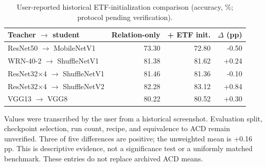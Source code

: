 \begin{table}[t]
\centering
\small
\setlength{\tabcolsep}{5pt}
\caption{User-reported historical ETF-initialization comparison (accuracy, \%; protocol pending verification).}
\label{tab:etf_user_reported}
\begin{tabular}{lrrr}
\toprule
Teacher $\to$ student & Relation-only & + ETF init. & $\Delta$ (pp) \\
\midrule
ResNet50 $\to$ MobileNetV1 & 73.30 & 72.80 & -0.50 \\
WRN-40-2 $\to$ ShuffleNetV1 & 81.38 & 81.62 & +0.24 \\
ResNet32$\times$4 $\to$ ShuffleNetV1 & 81.46 & 81.36 & -0.10 \\
ResNet32$\times$4 $\to$ ShuffleNetV2 & 82.28 & 83.12 & +0.84 \\
VGG13 $\to$ VGG8 & 80.22 & 80.52 & +0.30 \\
\bottomrule
\end{tabular}
\par\smallskip
\begin{minipage}{0.96\textwidth}\footnotesize
Values were transcribed by the user from a historical screenshot. Evaluation split, checkpoint selection, run count, recipe, and equivalence to ACD remain unverified. Three of five differences are positive; the unweighted mean is +0.16 pp. This is descriptive evidence, not a significance test or a uniformly matched benchmark. These entries do not replace archived ACD means.
\end{minipage}
\end{table}
